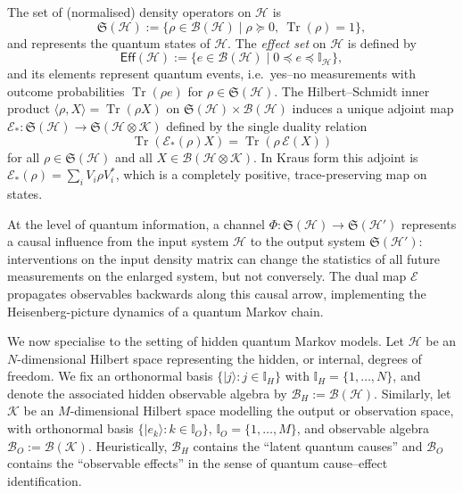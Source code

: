 \documentclass[11pt, reco]{article}
\begin{document}
The set of (normalised) density operators on $\mathcal{H}$ is
\[
\mathfrak{S}(\mathcal{H})
:=
\bigl\{\rho\in\mathcal{B}(\mathcal{H})
\;\big|\;
\rho \succeq 0,\ \operatorname{Tr}(\rho)=1\bigr\},
\]
and represents the quantum states of $\mathcal{H}$. The \emph{effect set} on $\mathcal{H}$ is defined by
\[
\mathsf{Eff}(\mathcal{H})
:=
\bigl\{e\in\mathcal{B}(\mathcal{H})
\;\big|\;
0 \preceq e \preceq \mathbb{I}_{\mathcal{H}}\bigr\},
\]
and its elements represent quantum events, i.e.\ yes–no measurements with outcome probabilities $\operatorname{Tr}(\rho e)$ for $\rho\in\mathfrak{S}(\mathcal{H})$.
The Hilbert–Schmidt inner product \(\langle\rho,X\rangle=\operatorname{Tr}(\rho X)\) on \(\mathfrak{S}(\mathcal{H})\times\mathcal{B}(\mathcal{H})\) induces a unique adjoint map \(\mathcal{E}_*:\mathfrak{S}(\mathcal{H})\to\mathfrak{S}(\mathcal{H}\otimes\mathcal{K})\) defined by the single duality relation
\begin{equation}\label{eq_HS}
\operatorname{Tr}(\mathcal{E}_*(\rho)X)=\operatorname{Tr}(\rho\,\mathcal{E}(X))
\end{equation}
for all \(\rho\in\mathfrak{S}(\mathcal{H})\) and all \(X\in\mathcal{B}(\mathcal{H}\otimes\mathcal{K})\). In Kraus form this adjoint is \(\mathcal{E}_*(\rho)=\sum_i V_i \rho V_i^*\), which is a completely positive, trace-preserving map on states.





At the level of quantum information, a channel \(\Phi:\mathfrak{S}(\mathcal{H})\to\mathfrak{S}(\mathcal{H}')\) represents a causal influence from the input system \(\mathcal{H}\) to the output system \(\mathfrak{S}(\mathcal{H}')\): interventions on the input density matrix can change the statistics of all future measurements on the enlarged system, but not conversely. The dual map \(\mathcal{E}\) propagates observables backwards along this causal arrow, implementing the Heisenberg-picture dynamics of a quantum Markov chain.


We now specialise to the setting of hidden quantum Markov models. Let \(\mathcal{H}\) be an \(N\)-dimensional Hilbert space representing the hidden, or internal, degrees of freedom. We fix an orthonormal basis \(\{|j\rangle : j\in\mathbb{I}_H\}\) with \(\mathbb{I}_H=\{1,\dots,N\}\), and denote the associated hidden observable algebra by
\(
\mathcal{B}_H := \mathcal{B}(\mathcal{H}).
\)
Similarly, let \(\mathcal{K}\) be an \(M\)-dimensional Hilbert space modelling the output or observation space, with orthonormal basis \(\{|e_k\rangle : k\in\mathbb{I}_O\}\), \(\mathbb{I}_O=\{1,\dots,M\}\), and observable algebra
\(
\mathcal{B}_O := \mathcal{B}(\mathcal{K}).
\)
Heuristically, \(\mathcal{B}_H\) contains the “latent quantum causes” and \(\mathcal{B}_O\) contains the “observable effects” in the sense of quantum cause–effect identification.
\end{document}
